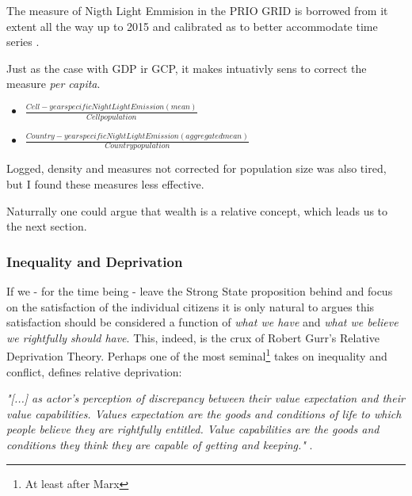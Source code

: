 \documentclass[a4paper]{article}
\begin{document}
 The measure of Nigth Light Emmision in the PRIO GRID is borrowed from \cite{Elvidge_2014}it extent all the way up to 2015 and calibrated as to better accommodate time series \cite{prio_code_2015}.\par
 
 Just as the case with GDP ir GCP, it makes intuativly sens to correct the measure \emph{per capita}.
 
 \begin{itemize}
     \item $\frac{Cell-year specific Night Light Emission (mean)}{Cell population}$
     \item $\frac{Country-year specific Night Light Emission (aggregated mean)}{Country population}$ 
 \end{itemize}

Logged, density and measures not corrected for population size was also tired, but I found these measures less effective.\par

Naturrally one could argue that wealth is a relative concept, which leads us to the next section.\par

\subsubsection{Inequality and Deprivation} %

If we - for the time being - leave the Strong State proposition behind and focus on the satisfaction of the individual citizens it is only natural to argues this satisfaction should be considered a function of \emph{what we have} and \emph{what we believe we rightfully should have}. This, indeed, is the crux of Robert Gurr's \citeyearpar{Gurr_1970} Relative Deprivation Theory. Perhaps one of the most seminal\footnote{At least after Marx} takes on inequality and conflict, \cite{Gurr_1970} defines relative deprivation: 

\begin{displayquote}
\emph{"[...] as actor's perception of discrepancy between their value expectation and their value capabilities. Values expectation are the goods and conditions of life to which people believe they are rightfully entitled. Value capabilities are the goods and conditions they think they are capable of getting and keeping."} \citep[24]{Gurr_1970}. 
\end{displayquote}
\end{document}
